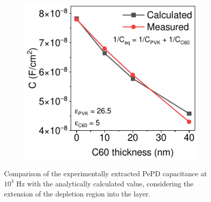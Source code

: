 \begin{figure}[ht!]
    \centering
    
    \begin{subfigure}[t]{0.45\textwidth}
        \centering
        \includegraphics[width=\textwidth]{chapters/transport_layers/images/C_f_c60_thick.pdf} %
    \end{subfigure}
    \caption[Comparison of the experimentally extracted PePD capacitance with the analytically calculated values.]{Comparison of the experimentally extracted PePD capacitance at $10^3$ Hz with the analytically calculated value, considering the extension of the depletion region into the  layer.}
    \label{fig:etl_opt:capacitance_numerical_measured}
\end{figure}



